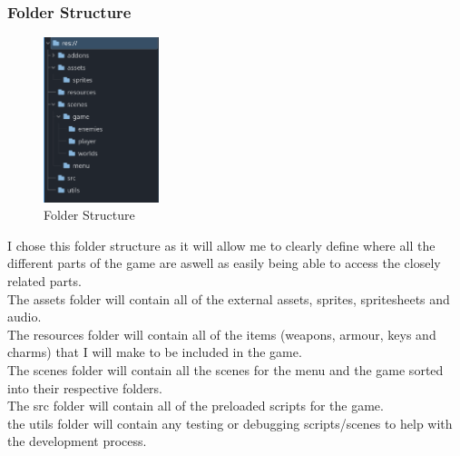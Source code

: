 \documentclass{article}
\begin{document}
        \subsubsection{Folder Structure}
        \begin{figure}[H]
                \centering
                \includegraphics[width = 0.3\textwidth]{images/design/File_System.PNG}
                \caption{Folder Structure}
        \end{figure}
        I chose this folder structure as it will allow me to clearly define where all the different parts of the game are aswell as easily being able to access the closely related parts.\\
        The assets folder will contain all of the external assets, sprites, spritesheets and audio.\\
        The resources folder will contain all of the items (weapons, armour, keys and charms) that I will make to be included in the game.\\
        The scenes folder will contain all the scenes for the menu and the game sorted into their respective folders.\\
        The src folder will contain all of the preloaded scripts for the game.\\
        the utils folder will contain any testing or debugging scripts/scenes to help with the development process.\\
\end{document}
